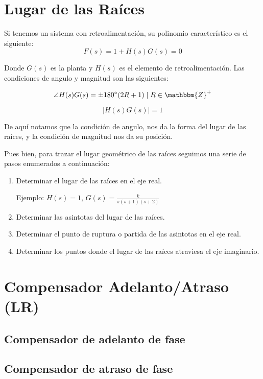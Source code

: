 \section{Lugar de las Raíces}
Si tenemos un sistema con retroalimentación, su polinomio característico es el siguiente:
\begin{equation}
F(s) = 1 + H(s) G(s) = 0
\end{equation}

Donde $G(s)$ es la planta y $H(s)$ es el elemento de retroalimentación. Las condiciones de angulo y magnitud son las siguientes:

\begin{equation}
\angle H(s) G(s) = \pm 180^{\circ} (2R + 1) \mid R \in \mathbbm{Z}^+
\end{equation}

\begin{equation}
\lvert H(s) G(s) \rvert = 1
\end{equation}

De aquí notamos que la condición de angulo, nos da la forma del lugar de las raíces, y la condición de magnitud nos da su posición.

Pues bien, para trazar el lugar geométrico de las raíces seguimos una serie de pasos enumerados a continuación:

\begin{enumerate}
\item
Determinar el lugar de las raíces en el eje real.

Ejemplo: $H(s) = 1$, $G(s) = \frac{k}{s(s+1)(s+2)}$


\item
Determinar las asintotas del lugar de las raíces.
\item
Determinar el punto de ruptura o partida de las asintotas en el eje real.
\item
Determinar los puntos donde el lugar de las raíces atraviesa el eje imaginario.
\end{enumerate}

\newpage
\section{Compensador Adelanto/Atraso (LR)}
\subsection{Compensador de adelanto de fase}
\subsection{Compensador de atraso de fase}
